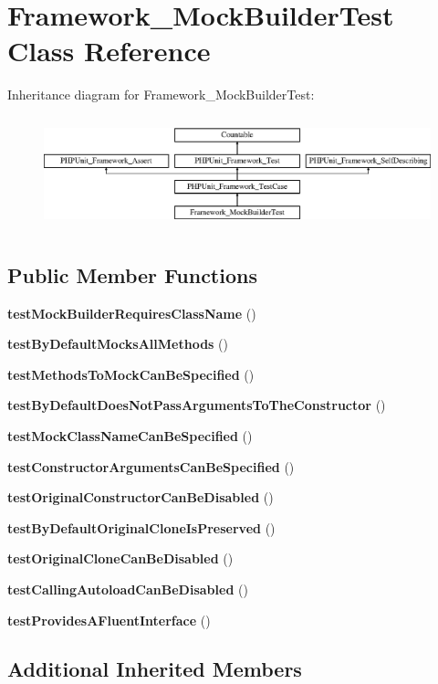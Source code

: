 \section{Framework\+\_\+\+Mock\+Builder\+Test Class Reference}
\label{class_framework___mock_builder_test}
Inheritance diagram for Framework\+\_\+\+Mock\+Builder\+Test\+:\begin{figure}[H]
\begin{center}
\leavevmode
\includegraphics[height=3.303835cm]{class_framework___mock_builder_test}
\end{center}
\end{figure}
\subsection*{Public Member Functions}
\begin{DoxyCompactItemize}
\item 
{\bf test\+Mock\+Builder\+Requires\+Class\+Name} ()
\item 
{\bf test\+By\+Default\+Mocks\+All\+Methods} ()
\item 
{\bf test\+Methods\+To\+Mock\+Can\+Be\+Specified} ()
\item 
{\bf test\+By\+Default\+Does\+Not\+Pass\+Arguments\+To\+The\+Constructor} ()
\item 
{\bf test\+Mock\+Class\+Name\+Can\+Be\+Specified} ()
\item 
{\bf test\+Constructor\+Arguments\+Can\+Be\+Specified} ()
\item 
{\bf test\+Original\+Constructor\+Can\+Be\+Disabled} ()
\item 
{\bf test\+By\+Default\+Original\+Clone\+Is\+Preserved} ()
\item 
{\bf test\+Original\+Clone\+Can\+Be\+Disabled} ()
\item 
{\bf test\+Calling\+Autoload\+Can\+Be\+Disabled} ()
\item 
{\bf test\+Provides\+A\+Fluent\+Interface} ()
\end{DoxyCompactItemize}
\subsection*{Additional Inherited Members}


